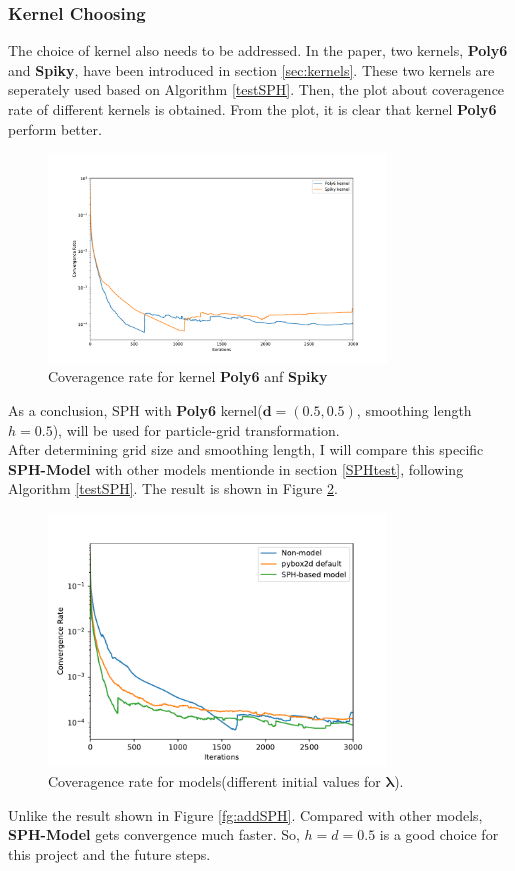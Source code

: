    \subsubsection{Kernel Choosing}
    The choice of kernel also needs to be addressed. In the paper, two kernels, \textbf{Poly6} and \textbf{Spiky}, have been introduced in section \ref{sec:kernels}. These two kernels are seperately used based on Algorithm \ref{testSPH}. Then, the plot about coveragence rate of different kernels is obtained. From the plot, it is clear that kernel \textbf{Poly6} perform better.  
    \begin{figure}[!ht]{}
        \centering
        \includegraphics[width=0.8\textwidth]{Figures/kerneltest.pdf}
        \caption{Coveragence rate for kernel \textbf{Poly6} anf \textbf{Spiky}}
        \label{fig:testd}
    \end{figure}
    As a conclusion, SPH with \textbf{Poly6} kernel($\pmb{d} = (0.5, 0.5)$, smoothing length $h=0.5$), will be used for particle-grid transformation. \\

    After determining grid size and smoothing length, I will compare this specific \textbf{SPH-Model} with other models mentionde in section \ref{SPHtest}, following Algorithm \ref{testSPH}. The result is shown in Figure \ref{fig:final_test}.
     \begin{figure}[!ht]
        \centering
        \includegraphics[width=0.8\textwidth]{Figures/final_SPH.pdf}
        \caption{Coveragence rate for models(different initial values for $\pmb{\lambda}$).}
        \label{fig:final_test}
    \end{figure}
    Unlike the result shown in Figure \ref{fg:addSPH}. Compared with other models, \textbf{SPH-Model} gets convergence much faster. So, $h=d=0.5$ is a good choice for this project and the future steps.

